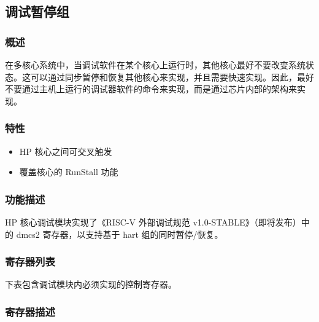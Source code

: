 \documentclass[main\_\_CN.tex]{subfiles}
\begin{document}
\newpage
\subsection{调试暂停组}
\label{sec:riscvcpu-cti}
\subsubsection{概述}
\label{sec:riscvcpu-cti-overview}
在多核心系统中，当调试软件在某个核心上运行时，其他核心最好不要改变系统状态。这可以通过同步暂停和恢复其他核心来实现，并且需要快速实现。因此，最好不要通过主机上运行的调试器软件的命令来实现，而是通过芯片内部的架构来实现。

\subsubsection{特性}
\label{sec:riscvcpu-cti-features}
\begin{itemize}
    \item HP 核心之间可交叉触发
    \item 覆盖核心的 RunStall 功能
\end{itemize}

\subsubsection{功能描述}
\label{sec:riscvcpu-cti-func-descr}

HP 核心调试模块实现了《RISC-V 外部调试规范 v1.0-STABLE》（即将发布）中的 dmcs2 寄存器，以支持基于 hart 组的同时暂停/恢复。


\newpage
\hypertarget{riscvcpu-cti-reg-summ}{}
\subsubsection{寄存器列表}
\label{sec:riscvcpu-dmcs2-desc}


下表包含调试模块内必须实现的控制寄存器。




\subsubsection{寄存器描述}
\label{sec:riscvcpu-cti-reg-desc}

\end{document}
